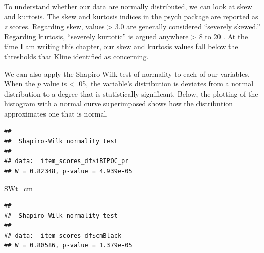 \documentclass[
  english,
]{book}
\newenvironment{Shaded}{\begin{snugshade}}{\end{snugshade}}
\newcommand{\CommentTok}[1]{\textcolor[rgb]{0.56,0.35,0.01}{\textit{#1}}}
\newcommand{\FunctionTok}[1]{\textcolor[rgb]{0.00,0.00,0.00}{#1}}
\newcommand{\NormalTok}[1]{#1}
\newcommand{\OtherTok}[1]{\textcolor[rgb]{0.56,0.35,0.01}{#1}}
\newcommand{\SpecialCharTok}[1]{\textcolor[rgb]{0.00,0.00,0.00}{#1}}
\begin{document}
To understand whether our data are normally distributed, we can look at skew and kurtosis. The skew and kurtosis indices in the psych package are reported as \emph{z} scores. Regarding skew, values \textgreater{} 3.0 are generally considered ``severely skewed.'' Regarding kurtosis, ``severely kurtotic'' is argued anywhere \textgreater{} 8 to 20 \citep{kline_principles_2016}. At the time I am writing this chapter, our skew and kurtosis values fall below the thresholds that Kline identified as concerning.

We can also apply the Shapiro-Wilk test of normality to each of our variables. When the \(p\) value is \textless{} .05, the variable's distribution is deviates from a normal distribution to a degree that is statistically significant. Below, the plotting of the histogram with a normal curve superimposed shows how the distribution approximates one that is normal.

\begin{Shaded}
\end{Shaded}

\begin{verbatim}
## 
##  Shapiro-Wilk normality test
## 
## data:  item_scores_df$iBIPOC_pr
## W = 0.82348, p-value = 4.939e-05
\end{verbatim}

\begin{Shaded}
\begin{Highlighting}[]
\NormalTok{SWt\_cm}
\end{Highlighting}
\end{Shaded}

\begin{verbatim}
## 
##  Shapiro-Wilk normality test
## 
## data:  item_scores_df$cmBlack
## W = 0.80586, p-value = 1.379e-05
\end{verbatim}
\end{document}

